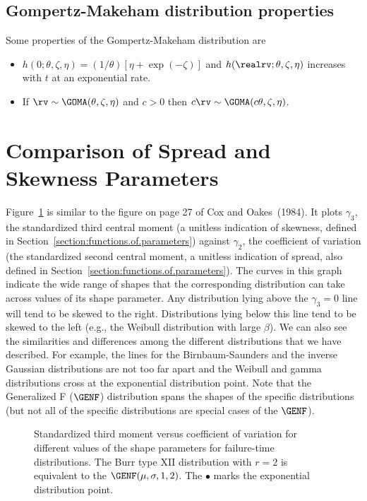 \subsection{Gompertz-Makeham distribution properties}
Some properties of the Gompertz-Makeham distribution are
\begin{itemize}
 \item $h(0;\theta,\zeta, \eta)=(1/\theta)[\eta+\exp(-\zeta)]$
and  $h(\realrv;\theta,\zeta, \eta)$
increases with $t$ at an exponential rate.

 \item If $\rv \sim \GOMA(\theta,\zeta, \eta)$
and $c>0$ then
$c \rv \sim \GOMA(c \theta,\zeta, \eta)$.

\end{itemize}


\section{Comparison of Spread and Skewness
Parameters} 
\label{section:comp.shape}
Figure~\ref{figure:momentplot.ps} is similar to the figure
on page 27 of Cox and Oakes~(1984).  It plots $\gamma_{3}$, the
standardized third central moment (a unitless indication of skewness,
defined in Section~\ref{section:functions.of.parameters}) against
$\gamma_{2}$, the coefficient of variation (the standardized second
central moment, a unitless indication of spread, also defined in
Section~\ref{section:functions.of.parameters}). The curves in this
graph indicate the wide range of shapes that the corresponding
distribution can take across values of its shape parameter. Any
distribution lying above the $\gamma_{3}=0$ line will tend to be
skewed to the right.  Distributions lying below this line tend to be
skewed to the left (e.g., the Weibull distribution with large
$\beta$). We can also see the similarities and differences among the
different distributions that we have described.  For example, the
lines for the Birnbaum-Saunders and the inverse Gaussian distributions
are not too far apart and the Weibull and gamma distributions cross at
the exponential distribution point.  Note that the Generalized F ($\GENF$)
distribution spans the shapes of the specific distributions (but not
all of the specific distributions are special cases of the $\GENF$).
\begin{figure}
\caption{Standardized third moment versus coefficient of
variation for different values of the shape parameters for
failure-time distributions. The Burr type XII distribution with
$r=2$ is equivalent to the $\GENF(\mu,\sigma,1,2)$. The $\bullet$
marks the exponential distribution point.}
\label{figure:momentplot.ps}
\end{figure}


